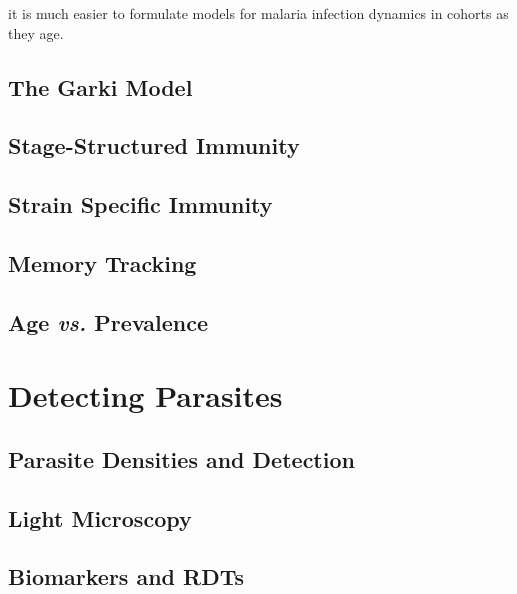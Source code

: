 \documentclass[
]{book}
\begin{document}
it is much easier to formulate models for malaria infection dynamics in cohorts as they age.

\hypertarget{the-garki-model}{%
\section{The Garki Model}\label{the-garki-model}}

\hypertarget{stage-structured-immunity}{%
\section{Stage-Structured Immunity}\label{stage-structured-immunity}}

\hypertarget{strain-specific-immunity}{%
\section{Strain Specific Immunity}\label{strain-specific-immunity}}

\hypertarget{memory-tracking}{%
\section{Memory Tracking}\label{memory-tracking}}

\hypertarget{age-vs.-prevalence}{%
\section{\texorpdfstring{Age \emph{vs.} Prevalence}{Age vs. Prevalence}}\label{age-vs.-prevalence}}

\hypertarget{detecting-parasites}{%
\chapter{Detecting Parasites}\label{detecting-parasites}}

\hypertarget{parasite-densities-and-detection}{%
\section{Parasite Densities and Detection}\label{parasite-densities-and-detection}}

\hypertarget{light-microscopy}{%
\section{Light Microscopy}\label{light-microscopy}}

\hypertarget{biomarkers-and-rdts}{%
\section{Biomarkers and RDTs}\label{biomarkers-and-rdts}}
\end{document}
